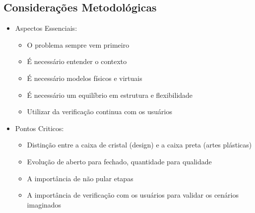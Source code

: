 \documentclass{article}
\begin{document}
\subsection{Considerações Metodológicas}
\begin{itemize}
    \item Aspectos Essenciais:
    \begin{itemize}
        \item O problema sempre vem primeiro
        \item É necessário entender o contexto
        \item É necessário modelos físicos e virtuais
        \item É necessário um equilíbrio em estrutura e flexibilidade
        \item Utilizar da verificação continua com os usuários
    \end{itemize}
    \item Pontos Criticos:
    \begin{itemize}
        \item Distinção entre a caixa de cristal (design) e a caixa preta (artes plásticas)
        \item Evolução de aberto para fechado, quantidade para qualidade
        \item A importância de não pular etapas
        \item A importância de verificação com os usuários para validar os cenários imaginados
    \end{itemize}
\end{itemize}
\end{document}

